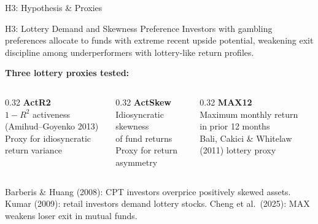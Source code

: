 \documentclass[10pt, aspectratio=169]{beamer}
\begin{document}
\begin{frame}{H3: Hypothesis \& Proxies}
  \begin{block}{H3: Lottery Demand and Skewness Preference}
    Investors with gambling preferences allocate to funds with extreme recent
    upside potential, weakening exit discipline among underperformers with
    lottery-like return profiles.
  \end{block}
  \vspace{8pt}
  \textbf{Three lottery proxies tested:}
  \vspace{4pt}
  \begin{columns}[T]
    \begin{column}{0.32\textwidth}
      \textbf{ActR2}\\
      $1 - R^2$ activeness\\
      (Amihud–Goyenko 2013)\\
      \small Proxy for idiosyncratic return variance
    \end{column}
    \begin{column}{0.32\textwidth}
      \textbf{ActSkew}\\
      Idiosyncratic skewness\\
      of fund returns\\
      \small Proxy for return asymmetry
    \end{column}
    \begin{column}{0.32\textwidth}
      \textbf{MAX12}\\
      Maximum monthly return\\
      in prior 12 months\\
      \small Bali, Cakici \& Whitelaw (2011) lottery proxy
    \end{column}
  \end{columns}
  \vspace{8pt}
  \footnotesize
  Barberis \& Huang (2008): CPT investors overprice positively skewed assets.
  Kumar (2009): retail investors demand lottery stocks.
  Cheng et al.\ (2025): MAX weakens loser exit in mutual funds.
\end{frame}
\end{document}

